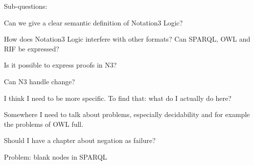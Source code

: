 Sub-questions:

Can we give a clear semantic definition of Notation3 Logic?

How does Notation3 Logic interfere with other formats? Can SPARQL, OWL and RIF be expressed?

Is it possible to express proofs in N3?

Can N3 handle change?

I think I need to be more specific. To find that: what do I actually do here?



% 
% 



Somewhere I need to talk about problems, especially decidability and for example the problems of OWL full.

Should I have a chapter about negation as failure?

Problem: blank nodes in SPARQL